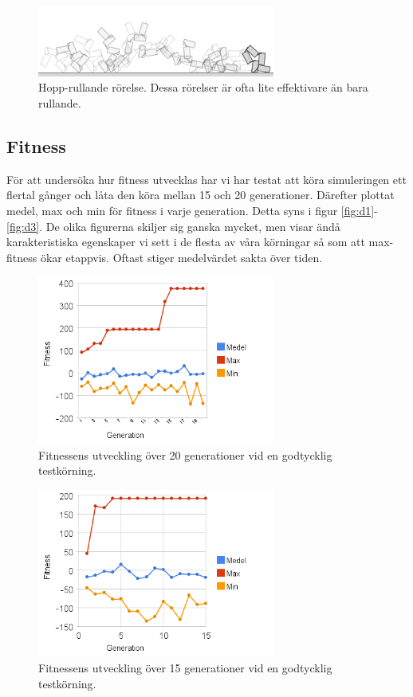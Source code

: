 \documentclass[titlepage, twocolumn, a4paper, 11pt, swedish]{article}
\begin{document}
\begin{figure}
    \includegraphics[width=78mm]{images/maskninja.png}
    \caption{Hopp-rullande rörelse. Dessa rörelser är ofta lite effektivare än bara rullande.}
    \label{fig:r2}
\end{figure}

\subsection{Fitness}
För att undersöka hur fitness utvecklas har vi har testat att köra simuleringen ett flertal gånger och låta den köra mellan 15 och 20 generationer. Därefter plottat medel, max och min för fitness i varje generation. Detta syns i figur \vref{fig:d1}-\vref{fig:d3}. De olika figurerna skiljer sig ganska mycket, men visar ändå karakteristiska egenskaper vi sett i de flesta av våra körningar så som att max-fitness ökar etappvis. Oftast stiger medelvärdet sakta över tiden.

\begin{figure}
    \includegraphics[width=78mm]{images/diagram4.png}
    \caption{Fitnessens utveckling över 20 generationer vid en godtycklig testkörning.}
    \label{fig:d1}
\end{figure}

\begin{figure}
    \includegraphics[width=78mm]{images/diagram3.png}
    \caption{Fitnessens utveckling över 15 generationer vid en godtycklig testkörning.}
    \label{fig:d2}
\end{figure}
\end{document}
